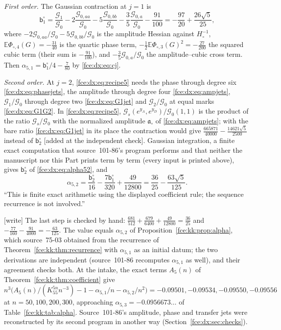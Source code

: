 \documentclass[11pt,a4paper]{article}
\numberwithin{equation}{section}
\theoremstyle{definition}\newtheorem{definition}[theorem]{Definition}
\theoremstyle{remark}\newtheorem{remark}[theorem]{Remark}
\newcommand{\Exp}{\mathbb E}
\begin{document}
\emph{First order.} The Gaussian contraction at $j=1$ is
\begin{equation}\label{fce:dx:eq:b1}
 \mathsf b^\circ_1=\frac{\mathcal G_1}{\mathcal G_0}-2\frac{\mathcal G_{0,aa}}{\mathcal G_0}
 -5\frac{\mathcal G_{0,bb}}{\mathcal G_0}-\frac35\frac{\mathcal G_{0,a}}{\mathcal G_0}-\frac{91}{100}
 =-\frac{97}{20}+\frac{26\sqrt5}{25},
\end{equation}
where $-2\mathcal G_{0,aa}/\mathcal G_0-5\mathcal G_{0,bb}/\mathcal G_0$ is the
amplitude Hessian against $H_\circ^{-1}$, $\Exp\Phi_{\circ,4}(G)=-\frac{31}{40}$ is the
quartic phase term, $-\frac12\Exp\Phi_{\circ,3}(G)^2=-\frac{27}{200}$ the
squared cubic term (their sum is $-\frac{91}{100}$), and
$-\frac35\mathcal G_{0,a}/\mathcal G_0$ the amplitude--cubic cross term. Then
$\alpha_{5,1}=\mathsf b^\circ_1/4-\frac7{80}$ by \eqref{fce:dx:eq:cj}.

\emph{Second order.} At $j=2$, \eqref{fce:dx:eq:recipe5} needs the phase through
degree six \eqref{fce:dx:eq:phasejets}, the amplitude through degree four
\eqref{fce:dx:eq:ampjets}, $\mathcal G_1/\mathcal G_0$ through degree two
\eqref{fce:dx:eq:G1jet} and $\mathcal G_2/\mathcal G_0$ at equal marks
\eqref{fce:dx:eq:G1G2}. In \eqref{fce:dx:eq:recipe5},
$\mathcal G_s(e^{y_A},e^{y_D})/\mathcal G_0(1,1)$ is the product of the ratio
$\mathcal G_s/\mathcal G_0$ with the normalized amplitude $\mathfrak a_\circ$
of \eqref{fce:dx:eq:ampjets}; with the bare ratio \eqref{fce:dx:eq:G1jet} in
its place the contraction would give
$\frac{665871}{40000}-\frac{14621\sqrt5}{2500}$ instead of $\mathsf b^\circ_2$
\textup{[}added at the independent check\textup{]}. Gaussian integration, a finite exact computation that source~101-86's
program performs and that neither the manuscript nor this Part prints term by
term (every input is printed above), gives $\mathsf b^\circ_2$ of
\eqref{fce:dx:eq:alpha52}, and
\[
 \alpha_{5,2}=\frac{\mathsf b^\circ_2}{16}-\frac{7\mathsf b^\circ_1}{320}+\frac{49}{12800}
 =\frac{36}{25}-\frac{63\sqrt5}{125}.
\]
``This is finite exact arithmetic using the displayed coefficient rule; the
sequence recurrence is not involved.''

\textup{[write]} The last step is checked by hand: $\frac{681}{512}+\frac{679}{6400}
+\frac{49}{12800}=\frac{36}{25}$ and $-\frac{77}{160}-\frac{91}{4000}=-\frac{63}{125}$.
The value equals $\alpha_{5,2}$ of Proposition~\ref{fce:kk:prop:alpha}, which
source~75-03 obtained from the recurrence of
Theorem~\ref{fce:kk:thm:recurrence} with $\alpha_{5,1}$ as an initial datum;
the two derivations are independent (source~101-86 recomputes $\alpha_{5,1}$
as well), and their agreement checks both. At the intake, the exact terms $A_5(n)$ of
Theorem~\ref{fce:kk:thm:coefficient} give
$n^3\bigl(A_5(n)/(K_55^{5n}n^{-3})-1-\alpha_{5,1}/n-\alpha_{5,2}/n^2\bigr)
=-0.09501,-0.09534,-0.09550,-0.09556$ at $n=50,100,200,300$, approaching
$\alpha_{5,3}=-0.0956673\ldots$ of Table~\ref{fce:kk:tab:alpha}. Source~101-86's
amplitude, phase and transfer jets were reconstructed by its second program
in another way (Section~\ref{fce:dx:sec:checks}).
\end{document}
